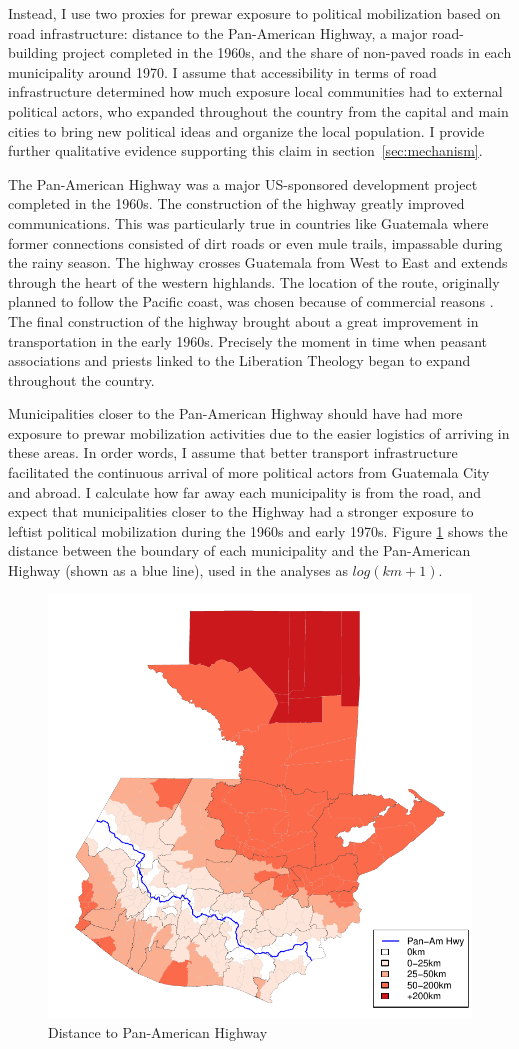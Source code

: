 \documentclass[12pt, notitlepage]{article}
\begin{document}
Instead, I use two proxies for prewar exposure to political mobilization based on road infrastructure: distance to the Pan-American Highway, a major road-building project completed in the 1960s, and the share of non-paved roads in each municipality around 1970.
I assume that accessibility in terms of road infrastructure determined how much exposure local communities had to external political actors, who expanded throughout the country from the capital and main cities to bring new political ideas and organize the local population.
I provide further qualitative evidence supporting this claim in section~\ref{sec:mechanism}.

The Pan-American Highway was a major US-sponsored development project completed in the 1960s.
The construction of the highway greatly improved communications.
This was particularly true in countries like Guatemala where former connections consisted of dirt roads or even mule trails, impassable during the rainy season.
The highway crosses Guatemala from West to East and extends through the heart of the western highlands.
The location of the route, originally planned to follow the Pacific coast, was chosen because of commercial reasons \citep{Rutkow:2019aa}.
The final construction of the highway brought about a great improvement in transportation in the early 1960s.
Precisely the moment in time when peasant associations and priests linked to the Liberation Theology began to expand throughout the country.

Municipalities closer to the Pan-American Highway should have had more exposure to prewar mobilization activities due to the easier logistics of arriving in these areas.
In order words, I assume that better transport infrastructure facilitated the continuous arrival of more political actors from Guatemala City and abroad.
I calculate how far away each municipality is from the road, and expect that municipalities closer to the Highway had a stronger exposure to leftist political mobilization during the 1960s and early 1970s.
Figure \ref{fig:map_panam} shows the distance between the boundary of each municipality and the Pan-American Highway (shown as a blue line), used in the analyses as $log(km + 1)$.

\begin{figure}[htb!]
  \centering
    \includegraphics[width = .4\textwidth]{img/map_panam}

  \caption{Distance to Pan-American Highway} \label{fig:map_panam}

\end{figure}
\end{document}

